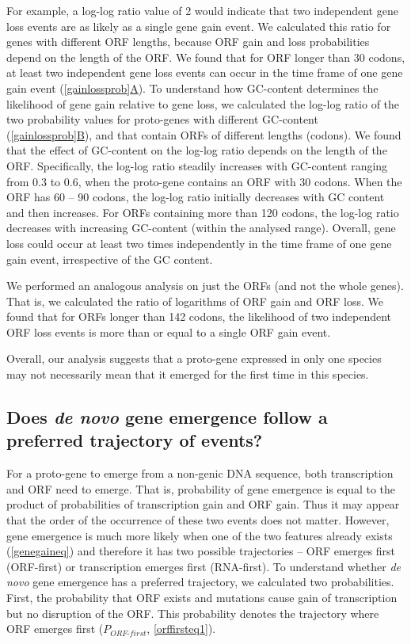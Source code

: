 \documentclass[12pt,a4paper]{article}
\begin{document}
For example, a log-log ratio value of 2 would indicate that two independent gene loss events are as likely as a single gene gain event. We calculated this ratio for genes with different ORF lengths, because ORF gain and loss probabilities depend on the length of the ORF. We found that for ORF longer than 30 codons, at least two independent gene loss events can occur in the time frame of one gene gain event (\hyperref[gainlossprob]{\autoref{gainlossprob}A}). To understand how GC-content determines the likelihood of gene gain relative to gene loss, we calculated the log-log ratio of the two probability values for proto-genes with different GC-content (\hyperref[gainlossprob]{\autoref{gainlossprob}B}), and that contain ORFs of different lengths (codons). We found that the effect of GC-content on the log-log ratio depends on the length of the ORF. Specifically, the log-log ratio steadily increases with GC-content ranging from 0.3 to 0.6, when the proto-gene contains an ORF with 30 codons. When the ORF has 60 -- 90 codons, the log-log ratio initially decreases with GC content and then increases. For ORFs containing more than 120 codons, the log-log ratio decreases with increasing GC-content (within the analysed range). Overall, gene loss could occur at least two times independently in the time frame of one gene gain event, irrespective of the GC content.

We performed an analogous analysis on just the ORFs (and not the whole genes). That is, we calculated the ratio of logarithms of ORF gain and ORF loss. We found that for ORFs longer than 142 codons, the likelihood of two independent ORF loss events is more than or equal to a single ORF gain event. 

Overall, our analysis suggests that a proto-gene expressed in only one species may not necessarily mean that it emerged for the first time in this species. 

\subsection{Does \textit{de novo} gene emergence follow a preferred trajectory of events?}

For a proto-gene to emerge from a non-genic DNA sequence, both transcription and ORF need to emerge. That is, probability of gene emergence is equal to the product of probabilities of transcription gain and ORF gain. Thus it may appear that the order of the occurrence of these two events does not matter. However, gene emergence is much more likely when one of the two features already exists (\autoref{genegaineq}) and therefore it has two possible trajectories -- ORF emerges first (ORF-first) or transcription emerges first (RNA-first). To understand whether \textit{de novo} gene emergence has a preferred trajectory, we calculated two probabilities. First, the probability that ORF exists and  mutations cause gain of transcription but no disruption of the ORF. This probability denotes the trajectory where ORF emerges first ($P_\textit{ORF-first}$, \autoref{orffirsteq1}). 
\end{document}
